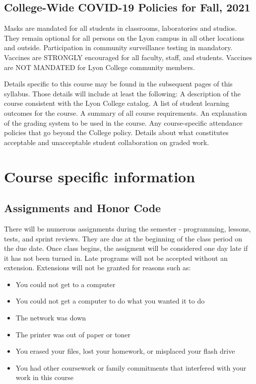 \documentclass[11pt]{article}
\begin{document}
\subsection{College-Wide COVID-19 Policies for Fall, 2021}
\label{sec:org8f7e4ed}

Masks are mandated for all students in classrooms, laboratories and studios.  They remain optional for all persons on the Lyon campus in all other locations and outside.
Participation in community surveillance testing in mandatory.
Vaccines are STRONGLY encouraged for all faculty, staff, and students. Vaccines are NOT MANDATED for Lyon College community members.

Details specific to this course may be found in the subsequent pages of this syllabus. Those details will include at least the following:
A description of the course consistent with the Lyon College catalog.
A list of student learning outcomes for the course.
A summary of all course requirements.
An explanation of the grading system to be used in the course.
Any course-specific attendance policies that go beyond the College policy.
Details about what constitutes acceptable and unacceptable student collaboration on graded work.

\section{Course specific information}
\label{sec:org4bf840f}
\subsection{Assignments and Honor Code}
\label{sec:org3095d40}

There will be numerous assignments during the semester -
programming, lessons, tests, and sprint reviews. They are due at
the beginning of the class period on the due date. Once class
begins, the assigment will be considered one day late if it has
not been turned in.  Late programs will not be accepted without an
extension.  Extensions will not be granted for reasons such as:

\begin{itemize}
\item You could not get to a computer
\item You could not get a computer to do what you wanted it to do
\item The network was down
\item The printer was out of paper or toner
\item You erased your files, lost your homework, or misplaced your
flash drive
\item You had other coursework or family commitments that interfered
with your work in this course
\end{itemize}
\end{document}
